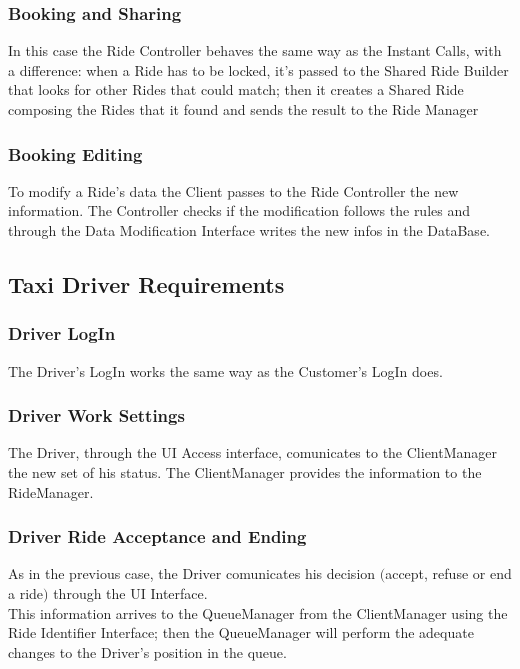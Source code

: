 		\subsubsection{Booking and Sharing}
		In this case the Ride Controller behaves the same way as the Instant Calls, with a difference: when a Ride has to be locked, it's passed to the Shared Ride Builder that looks for other Rides that could match; then it creates a Shared Ride composing the Rides that it found and sends the result to the Ride Manager 
		
		\subsubsection{Booking Editing}
		To modify a Ride's data the Client passes to the Ride Controller the new information. The Controller checks if the modification follows the rules and through the Data Modification Interface writes the new infos in the DataBase.
		
		
	\subsection {Taxi Driver Requirements}
	
		\subsubsection{Driver LogIn}
		The Driver's LogIn works the same way as the Customer's LogIn does.
		
		\subsubsection{Driver Work Settings}
		The Driver, through the UI Access interface, comunicates to the ClientManager the new set of his status. The ClientManager provides the information to the RideManager.
		
		\subsubsection{Driver Ride Acceptance and Ending}
		As in the previous case, the Driver comunicates his decision $($accept, refuse or end a ride$)$ through the UI Interface. \\ This information arrives to the QueueManager from the ClientManager using the Ride Identifier Interface; then the QueueManager will perform the adequate changes to the Driver's position in the queue.
